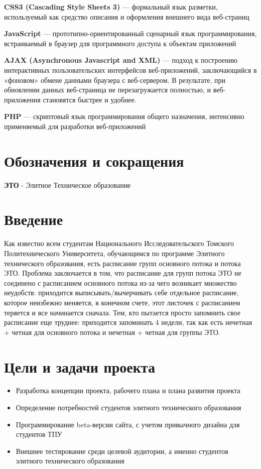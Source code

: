 \documentclass[14pt,a4paper]{report}
\makeatletter
\newif\if@prechapterused
\let\oldchapter\chapter
\renewcommand{\chapter}[1]
{
\if@prechapterused\vspace{-2em}\@prechapterusedfalse\fi
\begingroup
	\let\clearpage\relax
	\let\cleardoublepage\relax
	\oldchapter{#1}
\endgroup
}
\makeatother
\begin{document}
\textbf{CSS3 (Cascading Style Sheets 3)} --- формальный язык разметки, 
используемый как 
средство описания и оформления внешнего вида веб-страниц

\textbf{JavaScript} --- прототипно-ориентированный сценарный язык 
программирования, 
встраиваемый в браузер для программного доступа к объектам приложений

\textbf{AJAX (Asynchronous Javascript and XML)} ---  подход к построению 
интерактивных 
пользовательских интерфейсов веб-приложений, заключающийся в «фоновом» обмене 
данными браузера с веб-сервером. В результате, при обновлении данных 
веб-страница не перезагружается полностью, и веб-приложения становятся быстрее 
и удобнее.

\textbf{PHP} --- скриптовый язык программирования общего назначения, 
интенсивно 
применяемый для разработки веб-приложений

\chapter{Обозначения и сокращения}

\textbf{ЭТО} - Элитное Техническое образование

\chapter{Введение}

	Как известно всем студентам Национального Исследовательского Томского  
Политехнического Университета, обучающимся по программе Элитного технического 
образования, есть расписание групп основного потока и потока 
ЭТО. Проблема заключается в том, что расписание для групп потока ЭТО не 
соединено с расписанием основного потока из-за чего возникает множество 
неудобств: приходится выписывать/вычерчивать себе отдельное расписание, 
которое неизбежно меняется, в конечном счете, этот листочек с расписанием 
теряется и все начинается сначала. Тем, кто пытается просто запомнить свое 
расписание еще труднее: приходится запоминать 4 недели, так как есть нечетная 
+ четная для основного потока и нечетная + четная для  группы ЭТО. 

\newpage
\chapter{Цели и задачи проекта}

\begin{itemize}
\item Разработка концепции проекта, рабочего плана и плана развития проекта
\item Определение потребностей студентов элитного технического образования
\item Программирование beta-версии сайта, с учетом привычного дизайна для 
студентов ТПУ
\item Внешнее тестирование среди целевой аудитории, а именно студентов 
элитного технического образования
\end{itemize}
\end{document}

